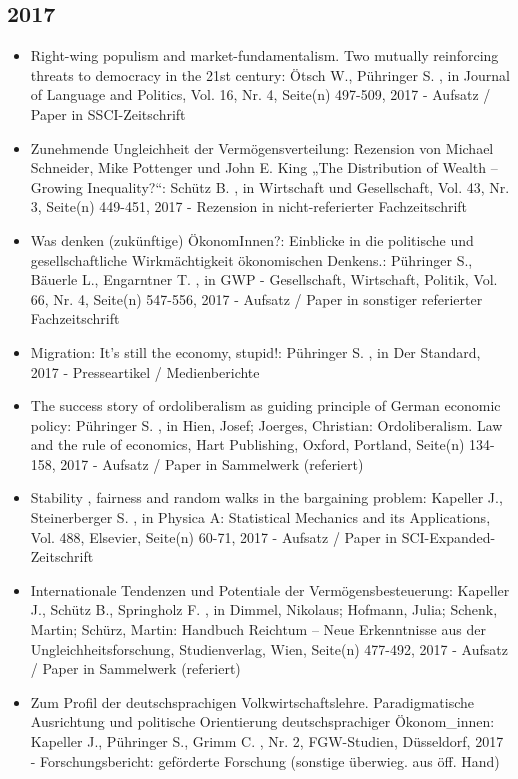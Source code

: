  \subsection{2017} 
 \begin{itemize} 
	 \item Right-wing populism and market-fundamentalism. Two mutually reinforcing threats to democracy in the 21st century: Ötsch W., Pühringer S. , in Journal of Language and Politics, Vol. 16, Nr. 4, Seite(n) 497-509, 2017 - Aufsatz / Paper in SSCI-Zeitschrift
	 \item Zunehmende Ungleichheit der Vermögensverteilung: Rezension von Michael Schneider, Mike Pottenger und John E. King „The Distribution of Wealth – Growing Inequality?“: Schütz B. , in Wirtschaft und Gesellschaft, Vol. 43, Nr. 3, Seite(n) 449-451, 2017 - Rezension in nicht-referierter Fachzeitschrift
	 \item Was denken (zukünftige) ÖkonomInnen?: Einblicke in die politische und gesellschaftliche Wirkmächtigkeit ökonomischen Denkens.: Pühringer S., Bäuerle L., Engarntner T. , in GWP - Gesellschaft, Wirtschaft, Politik, Vol. 66, Nr. 4, Seite(n) 547-556, 2017 - Aufsatz / Paper in sonstiger referierter Fachzeitschrift
	 \item Migration: It's still the economy, stupid!: Pühringer S. , in Der Standard, 2017 - Presseartikel / Medienberichte
	 \item The success story of ordoliberalism as guiding principle of German economic policy: Pühringer S. , in Hien, Josef; Joerges, Christian: Ordoliberalism. Law and the rule of economics, Hart Publishing, Oxford, Portland, Seite(n) 134-158, 2017 - Aufsatz / Paper in Sammelwerk (referiert)
	 \item Stability , fairness and random walks in the bargaining problem: Kapeller J., Steinerberger S. , in Physica A: Statistical Mechanics and its Applications, Vol. 488, Elsevier, Seite(n) 60-71, 2017 - Aufsatz / Paper in SCI-Expanded-Zeitschrift
	 \item Internationale Tendenzen und Potentiale der Vermögensbesteuerung: Kapeller J., Schütz B., Springholz F. , in Dimmel, Nikolaus; Hofmann, Julia; Schenk, Martin; Schürz, Martin: Handbuch Reichtum – Neue Erkenntnisse aus der Ungleichheitsforschung, Studienverlag, Wien, Seite(n) 477-492, 2017 - Aufsatz / Paper in Sammelwerk (referiert)
	 \item Zum Profil der deutschsprachigen Volkwirtschaftslehre. Paradigmatische Ausrichtung und politische Orientierung deutschsprachiger Ökonom_innen: Kapeller J., Pühringer S., Grimm C. , Nr. 2, FGW-Studien, Düsseldorf, 2017 - Forschungsbericht: geförderte Forschung (sonstige überwieg. aus öff. Hand)

\end{itemize}
